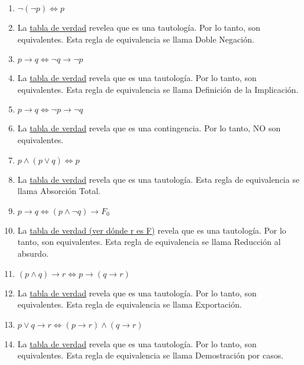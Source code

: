 \documentclass[a4paper]{article}
\newcommand{\answer}{\item[**]}
\newcommand{\then}{\to}
\newcommand{\Eq}{\Leftrightarrow}
\begin{document}
\begin{enumerate}
\begin{multicols}{2}
\begin{enumerate} [label=(\alph*)]
		\item $\neg (\neg p) \Eq  p$
		\answer La \href{https://www.wolframalpha.com/input?i=truth+table%3A+not+%28not+p%29+%3C%3D%3E+p}{tabla de verdad} revelea que es una tautología. Por lo tanto, son equivalentes. Esta regla de equivalencia se llama Doble Negación.

		\item $p\then q \Eq \neg q\then \neg p$
		\answer La \href{https://www.wolframalpha.com/input?i=%28p+%3D%3E+q%29+%3C%3D%3E+not+q+%3D%3E+not+p}{tabla de verdad} revela que es una tautología. Por lo tanto, son equivalentes. Esta regla de equivalencia se llama Definición de la Implicación.

		\item $p\then q \Eq \neg p\then \neg q$
		\answer La \href{https://www.wolframalpha.com/input?i=%28p+%3D%3E+q%29+%3C%3D%3E+%28not+p+%3D%3E+not+q%29}{tabla de verdad} revela que es una contingencia. Por lo tanto, NO son equivalentes.

		\item $p \land  (p \lor  q) \Eq  p$
		\answer La \href{https://www.wolframalpha.com/input?i=%28p+and+%28p+or++q%29%29+%3C%3D%3E++p}{tabla de verdad} revela que es una tautología. Esta regla de equivalencia se llama Absorción Total.

		\item $p\then q	\Eq (p \land  \neg q)\then F_0$
		\answer La \href{https://www.wolframalpha.com/input?i=%28p+%3D%3E+q%29+%3C%3D%3E+%28%28p+and+not+q%29+%3D%3E+r%29}{tabla de verdad (ver dónde r es F)} revela que es una tautología. Por lo tanto, son equivalentes. Esta regla de equivalencia se llama Reducción al absurdo.

		\item $(p\land q)\then r \Eq p\then (q\then r) $
		\answer La \href{https://www.wolframalpha.com/input?i=%28%28p+and+q%29+%3D%3E+r%29%3C%3D%3E+%28p+%3D%3E+%28q+%3D%3Er%29%29}{tabla de verdad} revela que es una tautología. Por lo tanto, son equivalentes. Esta regla de equivalencia se llama Exportación.

		\item $p\lor q \then  r	\Eq (p\then r) \land  (q\then r)$
		\answer La \href{https://www.wolframalpha.com/input?i=%28%28p+or+q+%29+%3D%3E++r%29+%3C%3D%3E+%28+%28p+%3D%3E+r%29+and+%28q+%3D%3E+r%29+%29}{tabla de verdad} revela que es una tautología. Por lo tanto, son equivalentes. Esta regla de equivalencia se llama Demostración por casos.

	\end{enumerate}
	\end{multicols}


\end{enumerate}
\end{document}

